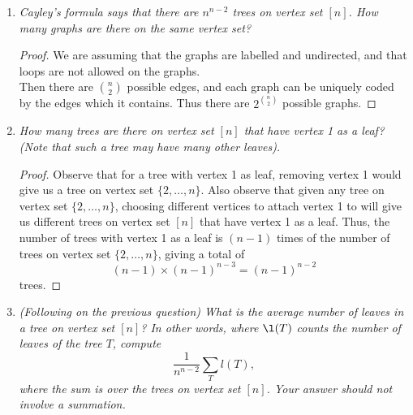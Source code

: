 \documentclass{article}
\begin{document}
\begin{enumerate}[label={\bf Q\arabic*:}]
\begin{proof}
      (d)$\Rightarrow$(c): Assume (d) holds but the graph $G$ is not
      connected. Then $G$ is the disjoint union of finitely many connected
      subgraphs, each being acyclic since $G$ is acyclic. Then from (e) and
      the equivalence of (e) with (c), the number of edges of each subgraph
      is one less than its number of vertices. Then $G$ would have $n-k$
      edges, where $k$ is the number of disjoint subgraphs. This
      contradicts $G$ having $n-1$ edges.
    \end{proof}

  \item \it Cayley's formula says that there are $n^{n-2}$ trees on vertex
    set $[n]$. How many graphs are there on the same vertex set?

    \begin{proof}
      We are assuming that the graphs are labelled and undirected, and that
      loops are not allowed on the graphs. \\

      Then there are $\binom{n}{2}$ possible edges, and each graph can be
      uniquely coded by the edges which it contains. Thus there are
      $2^{\binom{n}{2}}$ possible graphs.
    \end{proof}

  \item \it How many trees are there on vertex set $[n]$ that have vertex 1
    as a leaf? (Note that such a tree may have many other leaves).

    \begin{proof}
      Observe that for a tree with vertex 1 as leaf, removing vertex 1
      would give us a tree on vertex set $\{2,\ldots,n\}$. Also observe
      that given any tree on vertex set $\{2,\ldots,n\}$, choosing
      different vertices to attach vertex 1 to will give us different trees
      on vertex set $[n]$ that have vertex 1 as a leaf. Thus, the number of
      trees with vertex 1 as a leaf is $(n-1)$ times of the number of trees
      on vertex set $\{2,\ldots,n\}$, giving a total of
      \[(n-1)\times(n-1)^{n-3} = (n-1)^{n-2}\]
      trees.
    \end{proof}

  \item \it (Following on the previous question) What is the average number
    of leaves in a tree on vertex set $[n]$? In other words, where $\l(T)$
    counts the number of leaves of the tree $T$, compute
    \[\frac{1}{n^{n-2}}\sum_T l(T),\]
    where the sum is over the trees on vertex set $[n]$. Your answer should
    not involve a summation.


\end{enumerate}
\end{document}
